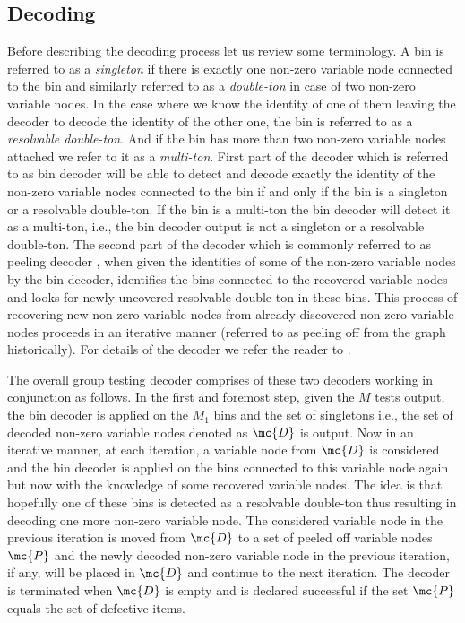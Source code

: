 \documentclass[conference,,twocolumn]{IEEEtran}
\begin{document}
\subsection*{Decoding}
Before describing the decoding process let us review some terminology. A bin is referred to as a \textit{singleton} if there is exactly one non-zero variable node connected to the bin and similarly referred to as a \textit{double-ton} in case of two non-zero variable nodes. In the case where we know the identity of one of them leaving the decoder to decode the identity of the other one, the bin is referred to as a \textit{resolvable double-ton}. And if the bin has more than two non-zero variable nodes attached we refer to it as a \textit{multi-ton}. First part of the decoder which is referred to as bin decoder will be able to detect and decode exactly the identity of the non-zero variable nodes connected to the bin if and only if the bin is a singleton or a resolvable double-ton. If the bin is a multi-ton the bin decoder will detect it as a multi-ton, i.e., the bin decoder output is not a singleton or a resolvable double-ton. The second part of the decoder which is commonly referred to as peeling decoder \cite{li2015subisit}, when given the identities of some of the non-zero variable nodes by the bin decoder, identifies the bins connected to the recovered variable nodes and looks for newly uncovered resolvable double-ton in these bins. This process of recovering new non-zero variable nodes from already discovered non-zero variable nodes proceeds in an iterative manner (referred to as peeling off from the graph historically). For details of the decoder we refer the reader to \cite{lee2015saffron}.

The overall group testing decoder comprises of these two decoders working in conjunction as follows. In the first and foremost step, given the $M$ tests output, the bin decoder is applied on the $M_1$ bins and the set of singletons i.e., the set of decoded non-zero variable nodes denoted as $\mc{D}$ is output. Now in an iterative manner, at each iteration, a variable node from $\mc{D}$ is considered and the bin decoder is applied on the bins connected to this variable node again but now with the knowledge of some recovered variable nodes. The idea is that hopefully one of these bins is detected as a resolvable double-ton thus resulting in decoding one more non-zero variable node. The considered variable node in the previous iteration is moved from $\mc{D}$ to a set of peeled off variable nodes $\mc{P}$ and the newly decoded non-zero variable node in the previous iteration, if any, will be placed in $\mc{D}$ and continue to the next iteration. The decoder is terminated when $\mc{D}$ is empty and is declared successful if the set $\mc{P}$ equals the set of defective items. 
\end{document}
